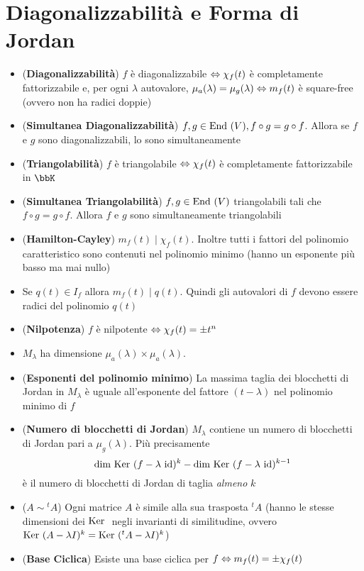 \documentclass[a4paper,NoNotes,GeneralMath]{stdmdoc}
\begin{document}
	\section*{Diagonalizzabilità e Forma di Jordan}
	\begin{itemize}
		\item ({\bf Diagonalizzabilità}) $f$ è diagonalizzabile $\Leftrightarrow \chi_f(t)$ è completamente fattorizzabile e, per ogni $\lambda$ autovalore, $\mu_a(\lambda) = \mu_g(\lambda) \Leftrightarrow m_f(t)$ è square-free (ovvero non ha radici doppie)
		\item ({\bf Simultanea Diagonalizzabilità}) $f,g\in\mbox{End }(V), f\circ g = g \circ f$. Allora se $f$ e $g$ sono diagonalizzabili, lo sono simultaneamente
		\item ({\bf Triangolabilità}) $f$ è triangolabile $\Leftrightarrow \chi_f(t)$ è completamente fattorizzabile in $\bbK$
		\item ({\bf Simultanea Triangolabilità}) $f,g\in\mbox{End }(V)$ triangolabili tali che $f\circ g=g\circ f$. Allora $f$ e $g$ sono simultaneamente triangolabili
		\item ({\bf Hamilton-Cayley}) $m_f(t) \mid \chi_f(t)$. Inoltre tutti i fattori del polinomio caratteristico sono contenuti nel polinomio minimo (hanno un esponente più basso ma mai nullo)
		\item Se $q(t) \in I_f$ allora $m_f(t) \mid q(t)$. Quindi gli autovalori di $f$ devono essere radici del polinomio $q(t)$	
		\item ({\bf Nilpotenza}) $f$ è nilpotente $\Leftrightarrow \chi_f(t) = \pm t^n$
		\item $M_\lambda$ ha dimensione $\mu_a(\lambda)\times\mu_a(\lambda)$.
		\item ({\bf Esponenti del polinomio minimo}) La massima taglia dei blocchetti di Jordan in $M_\lambda$ è uguale all'esponente del fattore $(t-\lambda)$ nel polinomio minimo di $f$
		\item ({\bf Numero di blocchetti di Jordan}) $M_\lambda$ contiene un numero di blocchetti di Jordan pari a $\mu_g(\lambda)$. Più precisamente $$\Dim\Ker (f-\lambda\ \Id)^k-\Dim\Ker (f-\lambda\ \Id)^{k-1}$$ è il numero di blocchetti di Jordan di taglia {\it almeno} $k$
		\item ({\bf $A \sim {}^tA$}) Ogni matrice $A$ è simile alla sua trasposta ${}^tA$ (hanno le stesse dimensioni dei $\mbox{Ker }$ negli invarianti di similitudine, ovvero $\mbox{Ker } (A-\lambda I)^k = \mbox{Ker } ({}^tA-\lambda I)^k$)
		\item ({\bf Base Ciclica}) Esiste una base ciclica per $f \Leftrightarrow m_f(t) = \pm \chi_f(t)$

\end{itemize}
\end{document}
